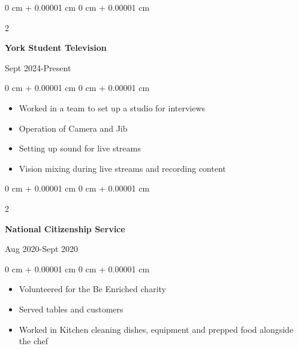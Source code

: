 \documentclass[10pt, letterpaper]{article}
\newenvironment{onecolentry}{
    \begin{adjustwidth}{
        0 cm + 0.00001 cm
    }{
        0 cm + 0.00001 cm
    }
}{
    \end{adjustwidth}
} %
\newenvironment{twocolentry}[2][]{
    \onecolentry
    \def\secondColumn{#2}
    \setcolumnwidth{\fill, 4.5 cm}
    \begin{paracol}{2}
}{
    \switchcolumn \raggedleft \secondColumn
    \end{paracol}
    \endonecolentry
} %
\begin{document}
\begin{samepage}
        \vspace{0.10 cm}


    \begin{twocolentry}{
              Sept 2024-Present
            }
                \textbf{York Student Television}

                \vspace{0.10 cm}
            \end{twocolentry}


            \vspace{0.10 cm}

            \begin{onecolentry}
                \begin{itemize}
                    \item Worked in a team to set up a studio for interviews
                    \item Operation of Camera and Jib
                    \item Setting up sound for live streams
                    \item Vision mixing during live streams and recording content
                \end{itemize}
            \end{onecolentry}

            \vspace{0.10 cm}

        \begin{twocolentry}{
                Aug 2020-Sept 2020
            }
                \textbf{National Citizenship Service}

                \vspace{0.10 cm}
            \end{twocolentry}


            \vspace{0.10 cm}

            \begin{onecolentry}
                \begin{itemize}
                    \item Volunteered for the Be Enriched charity
                    \item Served tables and customers
                    \item Worked in Kitchen cleaning dishes, equipment and prepped food alongside the chef
                \end{itemize}
            \end{onecolentry}
        
        \end{samepage}
\end{document}
